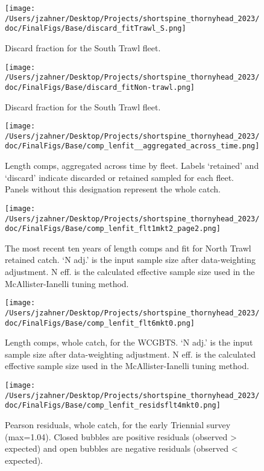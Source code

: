 \documentclass[11pt,
  english,
  letterpaper,
]{article}
\begin{document}
\begin{figure}
\centering
\texttt{[image: /Users/jzahner/Desktop/Projects/shortspine\_thornyhead\_2023/doc/FinalFigs/Base/discard\_fitTrawl\_S.png]}
\caption{Discard fraction for the South Trawl fleet.\label{fig:southtrl_disc}}
\end{figure}

\begin{figure}
\centering
\texttt{[image: /Users/jzahner/Desktop/Projects/shortspine\_thornyhead\_2023/doc/FinalFigs/Base/discard\_fitNon-trawl.png]}
\caption{Discard fraction for the South Trawl fleet.\label{fig:nontrl_disc}}
\end{figure}

\begin{figure}
\centering
\texttt{[image: /Users/jzahner/Desktop/Projects/shortspine\_thornyhead\_2023/doc/FinalFigs/Base/comp\_lenfit\_\_aggregated\_across\_time.png]}
\caption{Length comps, aggregated across time by fleet. Labels `retained' and `discard' indicate discarded or retained sampled for each fleet. Panels without this designation represent the whole catch.\label{fig:lencomps_all}}
\end{figure}

\begin{figure}
\centering
\texttt{[image: /Users/jzahner/Desktop/Projects/shortspine\_thornyhead\_2023/doc/FinalFigs/Base/comp\_lenfit\_flt1mkt2\_page2.png]}
\caption{The most recent ten years of length comps and fit for North Trawl retained catch. `N adj.' is the input sample size after data-weighting adjustment. N eff. is the calculated effective sample size used in the McAllister-Ianelli tuning method.\label{fig:ntrawl_comps_ten}}
\end{figure}

\begin{figure}
\centering
\texttt{[image: /Users/jzahner/Desktop/Projects/shortspine\_thornyhead\_2023/doc/FinalFigs/Base/comp\_lenfit\_flt6mkt0.png]}
\caption{Length comps, whole catch, for the WCGBTS. `N adj.' is the input sample size after data-weighting adjustment. N eff. is the calculated effective sample size used in the McAllister-Ianelli tuning method.\label{fig:fits_wcgbts}}
\end{figure}

\begin{figure}
\centering
\texttt{[image: /Users/jzahner/Desktop/Projects/shortspine\_thornyhead\_2023/doc/FinalFigs/Base/comp\_lenfit\_residsflt4mkt0.png]}
\caption{Pearson residuals, whole catch, for the early Triennial survey (max=1.04). Closed bubbles are positive residuals (observed \textgreater{} expected) and open bubbles are negative residuals (observed \textless{} expected).\label{fig:resids_tri1}}
\end{figure}
\end{document}
